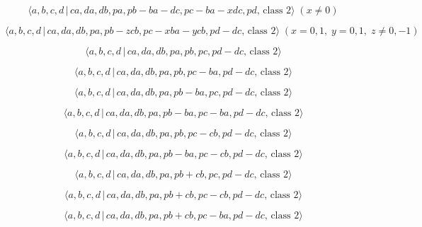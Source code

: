 \documentclass[10pt]{article}
\begin{document}
\begin{equation}
\langle a,b,c,d\,|\,ca,da,db,pa,pb-ba-dc,pc-ba-xdc,pd,\,\text{class }%
2\rangle \;(x \neq 0)  \tag{7.3108}
\end{equation}

\begin{equation}
\langle a,b,c,d\,|\,ca,da,db,pa,pb-zcb,pc-xba-ycb,pd-dc,\,\text{class }%
2\rangle \;(x=0,1,\;y=0,1,\;z\neq 0,-1)  \tag{7.3109}
\end{equation}

\begin{equation}
\langle a,b,c,d\,|\,ca,da,db,pa,pb,pc,pd-dc,\,\text{class }2\rangle 
\tag{7.3110}
\end{equation}

\begin{equation}
\langle a,b,c,d\,|\,ca,da,db,pa,pb,pc-ba,pd-dc,\,\text{class }2\rangle 
\tag{7.3111}
\end{equation}

\begin{equation}
\langle a,b,c,d\,|\,ca,da,db,pa,pb-ba,pc,pd-dc,\,\text{class }2\rangle 
\tag{7.3112}
\end{equation}

\begin{equation}
\langle a,b,c,d\,|\,ca,da,db,pa,pb-ba,pc-ba,pd-dc,\,\text{class }2\rangle 
\tag{7.3113}
\end{equation}

\begin{equation}
\langle a,b,c,d\,|\,ca,da,db,pa,pb,pc-cb,pd-dc,\,\text{class }2\rangle 
\tag{7.3114}
\end{equation}

\begin{equation}
\langle a,b,c,d\,|\,ca,da,db,pa,pb-ba,pc-cb,pd-dc,\,\text{class }2\rangle 
\tag{7.3115}
\end{equation}

\begin{equation}
\langle a,b,c,d\,|\,ca,da,db,pa,pb+cb,pc,pd-dc,\,\text{class }2\rangle 
\tag{7.3116}
\end{equation}

\begin{equation}
\langle a,b,c,d\,|\,ca,da,db,pa,pb+cb,pc-cb,pd-dc,\,\text{class }2\rangle 
\tag{7.3117}
\end{equation}

\begin{equation}
\langle a,b,c,d\,|\,ca,da,db,pa,pb+cb,pc-ba,pd-dc,\,\text{class }2\rangle 
\tag{7.3118}
\end{equation}
\end{document}
